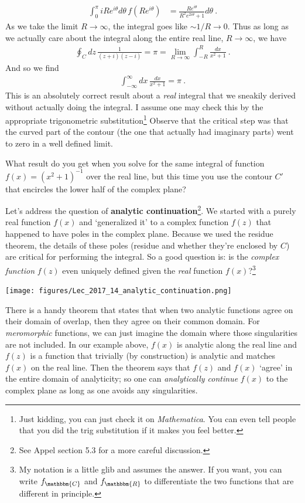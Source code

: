 \begin{example}
\begin{align}
	\int_0^\pi iR e^{i\theta} d\theta  \, f\left(Re^{i\theta}\right)
	&= 
	\frac{Re^{i\theta}}{R^2 e^{2i\theta}+1} d\theta \ .
\end{align}
As we take the limit $R\to\infty$, the integral goes like $\sim 1/R \to 0$. Thus as long as we actually care about the integral along the entire real line, $R\to \infty$, we have
\begin{align}
	\oint_Cdz\, \frac{1}{(z+i)(z-i)}  
	= \pi 
	= \lim_{R\to\infty} \int_{-R}^R \frac{dx}{x^2+1} \ .
\end{align}
And so we find
\begin{align}
	\int_{-\infty}^\infty dx \, 
	\frac{dx}{x^2+1}
	= \pi \ .
\end{align}
This is an absolutely correct result about a \emph{real} integral that we sneakily derived without actually doing the integral. I assume one may check this by the appropriate trigonometric substitution\footnote{Just kidding, you can just check it on \emph{Mathematica}. You can even tell people that you did the trig substitution if it makes you feel better.} Observe that the critical step was that the curved part of the contour (the one that actually had imaginary parts) went to zero in a well defined limit. 
\end{example}
\begin{exercise}
What result do you get when you solve for the same integral of function $f(x)=(x^2+1)^{-1}$ over the real line, but this time you use the contour $C'$ that encircles the lower half of the complex plane?
\end{exercise}
Let's address the question of \textbf{analytic continuation}\footnote{See Appel section 5.3 for a more careful discussion.}. We started with a purely real function $f(x)$ and `generalized it' to a complex function $f(z)$ that happened to have poles in the complex plane. Because we used the residue theorem, the details of these poles (residue and whether they're enclosed by $C$) are critical for performing the integral. So a good question is: is the \emph{complex function} $f(z)$ even uniquely defined given the \emph{real} function $f(x)$?\footnote{My notation is a little glib and assumes the answer. If you want, you can write $f_\mathbbm{C}$ and $f_\mathbbm{R}$ to differentiate the two functions that are different in principle.}
\begin{center}
\texttt{[image: figures/Lec\_2017\_14\_analytic\_continuation.png]}
\end{center}
There is a handy theorem that states that when two analytic functions agree on their domain of overlap, then they agree on their common domain. For \emph{meromorphic} functions, we can just imagine the domain where those singularities are not included. In our example above, $f(x)$ is analytic along the real line and $f(z)$ is a function that trivially (by construction) is analytic and matches $f(x)$ on the real line. Then the theorem says that $f(z)$ and $f(x)$ `agree' in the entire domain of analyticity; so one can \emph{analytically continue} $f(x)$ to the complex plane as long as one avoids any singularities.

